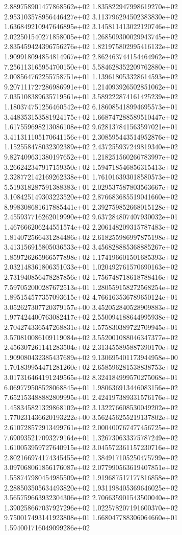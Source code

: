 2.889758901477868562e+02 1.835822947998619270e+02 2.953103578956446427e+02
3.113796294502383830e+02 1.636849210947646895e+02 3.145811413022120746e+02
2.022501540271858005e+02 1.268509300029943745e+02 2.835459424396756276e+02
1.821975802995416132e+02 1.909918094854814967e+02 2.862463744154464962e+02
7.256113165954700150e+01 5.584628352209762880e+01 2.008564762255758751e+01
1.139618053328614593e+02 9.207111727286986991e+01 1.214093926502851062e+01
7.035108389635719561e+01 3.589222874161425239e+02 1.180374751256460542e+02
6.186085418994695573e+01 3.448353153581924175e+02 1.668747288589510447e+02
1.617559698213086108e+02 9.628137841563597021e+01 3.411311105170641156e+01
2.308595443514952876e+02 1.152558478032302389e+02 2.437255937249819340e+02
9.827409631380197652e+01 1.218251560266783997e+02 3.266242347917159350e+02
1.594718546856315413e+02 2.328772142169262338e+01 1.761016393018580573e+02
5.519318287591388383e+01 2.029537587803563667e+02 3.108425149303223520e+02
2.876683685519041660e+02 8.998308681617885441e+01 2.392759852668015128e+02
2.455937716262019990e+02 9.637284807407930032e+01 1.467666206244551574e+02
2.206148209315787483e+02 1.814072566431284486e+02 2.618255986997875198e+02
3.413156915805036533e+02 3.456828885368885267e+02 1.859726265966577898e+02
1.174196601501685393e+02 2.032148361806351033e+01 1.020492761570690163e+02
2.731940856478287856e+02 1.756748718618788416e+02 7.597052000287672513e+01
1.280559158272568254e+02 1.895154577357093615e+02 4.766163536789650124e+01
3.052627307720379157e+00 3.452052840528909883e+02 1.977424400763082417e+02
2.550094188644995938e+02 2.704274336547268831e+02 1.575830389722709945e+01
3.570810086109119084e+02 3.552001088046347377e+02 2.456307261141283504e+02
2.313455895887390170e+02 1.909080432385437689e+02 9.130695401173944958e+00
1.701839954471281260e+02 2.658596281538838753e+02 3.017316464191249565e+02
8.324184999570275068e+01 6.069779508528068845e+01 1.980636913446083156e+02
7.652153488882809995e+01 2.424197389331576176e+02 1.458345821329868102e+02
3.132276608530049202e+02 1.770231436620193222e+00 3.562456255219137802e+02
2.610728572913499761e+02 2.000400767477456725e+02 7.690935217093279164e+01
1.326730633375787249e+02 1.610053959727640915e+02 3.045572361157230716e+02
2.802166974174345455e+02 1.384917105250475799e+02 3.097068061856176087e+02
2.077990563619407851e+02 1.558747980454985509e+02 1.919687517177816858e+02
2.288503505634493820e+02 1.931198405369646025e+02 3.565759663932304306e+02
2.706635901543500040e+02 1.390258667037927296e+02 1.022578207191600370e+02
9.750017493141923808e+01 1.668047788306064660e+01 1.594001716049099286e+02
